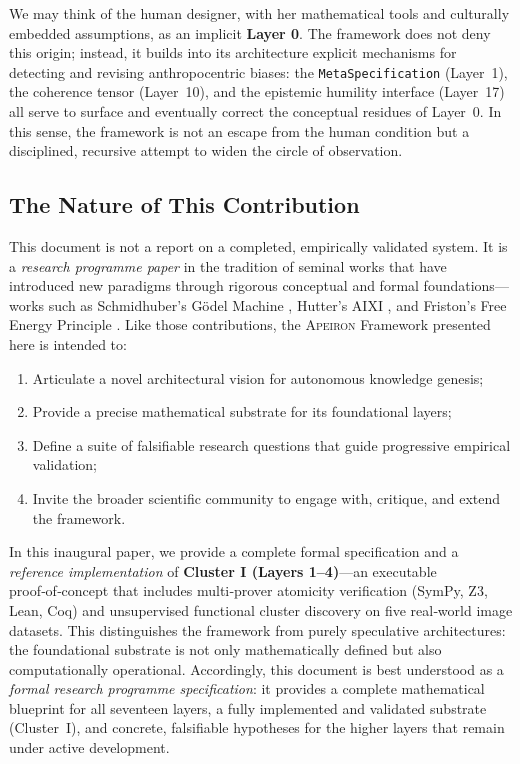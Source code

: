 We may think of the human designer, with her mathematical tools and culturally embedded assumptions, as an implicit \textbf{Layer 0}. The framework does not deny this origin; instead, it builds into its architecture explicit mechanisms for detecting and revising anthropocentric biases: the \texttt{MetaSpecification} (Layer~1), the coherence tensor (Layer~10), and the epistemic humility interface (Layer~17) all serve to surface and eventually correct the conceptual residues of Layer~0. In this sense, the framework is not an escape from the human condition but a disciplined, recursive attempt to widen the circle of observation.

\subsection{The Nature of This Contribution}
\label{subsec:nature_of_contribution}

This document is not a report on a completed, empirically validated system. It is a \emph{research programme paper} in the tradition of seminal works that have introduced new paradigms through rigorous conceptual and formal foundations---works such as Schmidhuber's Gödel Machine \cite{schmidhuber2007}, Hutter's AIXI \cite{hutter2005}, and Friston's Free Energy Principle \cite{friston2010}. Like those contributions, the \textsc{Apeiron} Framework presented here is intended to:

\begin{enumerate}
    \item Articulate a novel architectural vision for autonomous knowledge genesis;
    \item Provide a precise mathematical substrate for its foundational layers;
    \item Define a suite of falsifiable research questions that guide progressive empirical validation;
    \item Invite the broader scientific community to engage with, critique, and extend the framework.
\end{enumerate}

In this inaugural paper, we provide a complete formal specification and a \emph{reference implementation} of \textbf{Cluster I (Layers 1--4)}—an executable proof‑of‑concept that includes multi‑prover atomicity verification (SymPy, Z3, Lean, Coq) and unsupervised functional cluster discovery on five real‑world image datasets. This distinguishes the framework from purely speculative architectures: the foundational substrate is not only mathematically defined but also computationally operational.
Accordingly, this document is best understood as a \emph{formal research
programme specification}: it provides a complete mathematical blueprint
for all seventeen layers, a fully implemented and validated substrate
(Cluster~I), and concrete, falsifiable hypotheses for the higher layers
that remain under active development.

